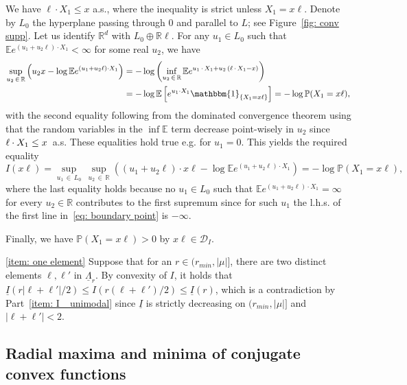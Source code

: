 \documentclass[AHL,Unicode,published]{cedram}
\newcommand{\ubar}[1]{\underline{#1}}
\newcommand{\Rbb}{\mathbb{R}}
\newcommand{\E}{\mathbb{E}}
\newcommand{\Pbb}{\mathbb{P}}
\newcommand{\I}{\mathbbm{1}}
\newcommand{\Dcl}{\mathcal{D}}
\begin{document}
\begin{proofc}
\break
We have $\ell \cdot X_1 \le x$ a.s., where the inequality is strict unless $X_1=x\ell$. Denote by $L_0$ the hyperplane passing through $0$ and parallel to $L$; see Figure~\ref{fig: conv supp}. Let us identify $\Rbb^d$ with $L_0 \oplus \Rbb \ell$. For any $u_1 \in L_0$ such that $\E e^{(u_1 + u_2 \ell) \cdot X_1} < \infty$ for some real $u_2$, we have
\begin{equation}\label{eq: boundary point}
\begin{aligned}
\sup_{u_2\,\in\,\Rbb} \left(u_2 x - \log \E e^{\left(u_1 + u_2 \ell\right) \cdot X_1} \right) &= - \log \left(\inf_{u_2\,\in\, \Rbb} \E e^{u_1\,\cdot\,X_1 + u_2\,\left(\ell\,\cdot\,X_1 - x\right)} \right) \\
&=- \log \E\left[e^{u_1 \cdot X_1} \I_{\left\{X_1 = x \ell\right\}}\right] = - \log \Pbb(X_1 = x \ell),
\end{aligned}
\end{equation}
with the second equality following from the dominated convergence theorem using that the random variables in the $\inf \E$ term decrease point-wisely in $u_2 $ since $\ell \cdot X_1\linebreak\le x$~a.s. These equalities hold true e.g. for $u_1=0$. This yields the required equality
\[
I(x \ell) = \sup_{u_1\,\in\,L_0} \,\sup_{u_2\,\in\,\Rbb} \left (\left(u_1 + u_2\ell\right) \cdot x \ell - \log \E e^{\left(u_1 + u_2 \ell\right) \cdot X_1} \right) = - \log \Pbb\left(X_1 = x \ell\right),
\]
where the last equality holds because no $u_1 \in L_0$ such that $\E e^{(u_1 + u_2 \ell) \cdot X_1} = \infty$ for every $u_2 \in \Rbb$ contributes to the first supremum since for such $u_1$ the l.h.s. of the first line in~\eqref{eq: boundary point} is $-\infty$.

Finally, we have $\Pbb(X_1 = x \ell)>0$ by $x \ell \in \Dcl_I$.

\eqref{item: one element} Suppose that for an $r \in (r_{min}, |\mu|]$, there are two distinct elements $\ell, \ell'$ in $\ubar{\Lambda}_r$. By convexity of $I$, it holds that $\ubar I(r|\ell + \ell'|/2) \le I(r(\ell + \ell')/2) \le \ubar I(r)$, which is a contradiction by Part~\eqref{item: I_ unimodal} since $\ubar I$ is strictly decreasing on $(r_{min}, |\mu|]$ and\linebreak$|\ell + \ell'|<2$.
\end{proofc}

\subsection{Radial maxima and minima of conjugate convex functions} \label{Sec: radial proofs}
\end{document}
